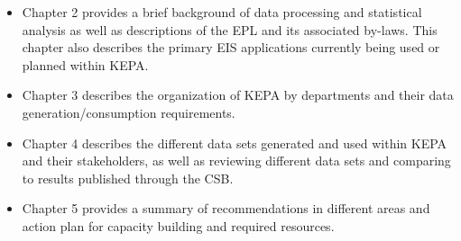 \begin{itemize}
\item Chapter 2 provides a brief background of data processing and statistical analysis as well as descriptions of the EPL and its associated by-laws. This chapter also describes the primary EIS applications currently being used or planned within KEPA.
\item Chapter 3 describes the organization of KEPA by departments and their data generation/consumption requirements. 
\item Chapter 4 describes the different data sets generated and used within KEPA and their stakeholders, as well as reviewing different data sets and comparing to results published through the CSB.
\item Chapter 5 provides a summary of recommendations in different areas and action plan for capacity building and required resources.


\end{itemize}